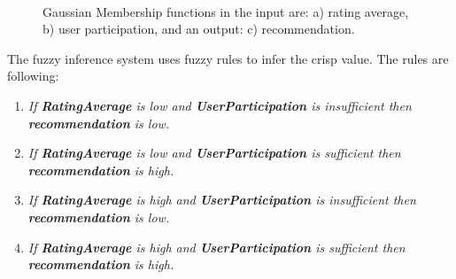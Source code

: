 \begin{figure}[ht!]
   \captionsetup{font=footnotesize}
   \centering
   \hspace{0.1\linewidth}
   \\[20pt]
   \caption{Gaussian Membership functions in the input are: a) rating average, 
   b) user participation, and an output: c) recommendation.}
   \label{fig:mffis} 
\end{figure}
The fuzzy inference system uses fuzzy rules to infer 
the crisp value. The rules are following: 
\begin{enumerate}
\item \textit{If \textbf{RatingAverage} is low and 
\textbf{UserParticipation} is insufficient then \textbf{recommendation} is low.}
\item \textit{If \textbf{RatingAverage} is low and 
\textbf{UserParticipation} is sufficient then \textbf{recommendation} is high.}
\item \textit{If \textbf{RatingAverage} is high and 
\textbf{UserParticipation} is insufficient then \textbf{recommendation} is low.}
\item \textit{If \textbf{RatingAverage} is high and 
\textbf{UserParticipation} is sufficient then \textbf{recommendation} is high.}
\end{enumerate}
